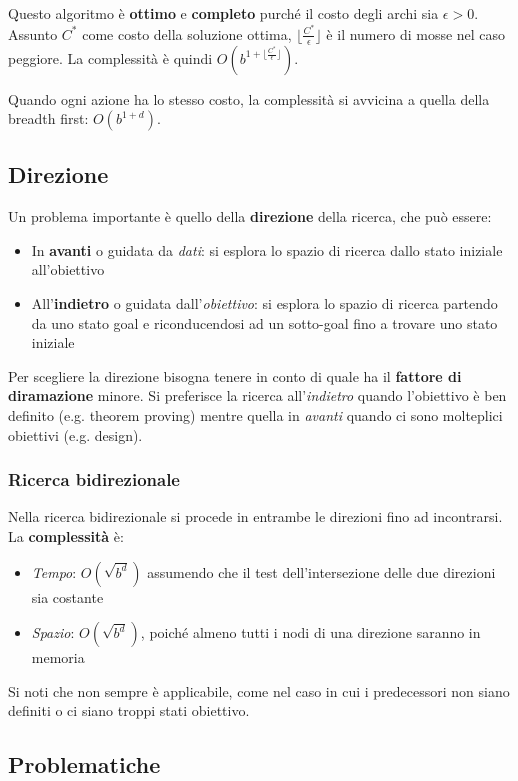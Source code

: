 Questo algoritmo è \textbf{ottimo} e \textbf{completo} purché il costo degli archi sia $\epsilon > 0$. Assunto $C^*$ come costo della soluzione ottima, $\lfloor \frac{C^*}{\epsilon}\rfloor$ è il numero di mosse nel caso peggiore. La complessità è quindi $O(b^{1+\lfloor \frac{C^*}{\epsilon}\rfloor})$.
\begin{note}
	Quando ogni azione ha lo stesso costo, la complessità si avvicina a quella della breadth first: $O(b^{1+d})$.
\end{note}
\subsection{Direzione}
Un problema importante è quello della \textbf{direzione} della ricerca, che può essere:
\begin{itemize}
	\item In \textbf{avanti} o guidata da \emph{dati}: si esplora lo spazio di ricerca dallo stato iniziale all'obiettivo
	\item All'\textbf{indietro} o guidata dall'\emph{obiettivo}: si esplora lo spazio di ricerca partendo da uno stato goal e riconducendosi ad un sotto-goal fino a trovare uno stato iniziale
\end{itemize}
Per scegliere la direzione bisogna tenere in conto di quale ha il \textbf{fattore di diramazione} minore.  Si preferisce la ricerca all'\emph{indietro} quando l'obiettivo è ben definito (e.g. theorem proving) mentre quella in \emph{avanti} quando ci sono molteplici obiettivi (e.g. design).\\
\subsubsection{Ricerca bidirezionale}
Nella ricerca bidirezionale si procede in entrambe le direzioni fino ad incontrarsi. La \textbf{complessità} è:
\begin{itemize}
	\item \emph{Tempo}: $O(\sqrt{b^d})$ assumendo che il test dell'intersezione delle due direzioni sia costante
	\item \emph{Spazio}: $O(\sqrt{b^d})$, poiché almeno tutti i nodi di una direzione saranno in memoria
\end{itemize}
Si noti che non sempre è applicabile, come nel caso in cui i predecessori non siano definiti o ci siano troppi stati obiettivo.

\subsection{Problematiche}
